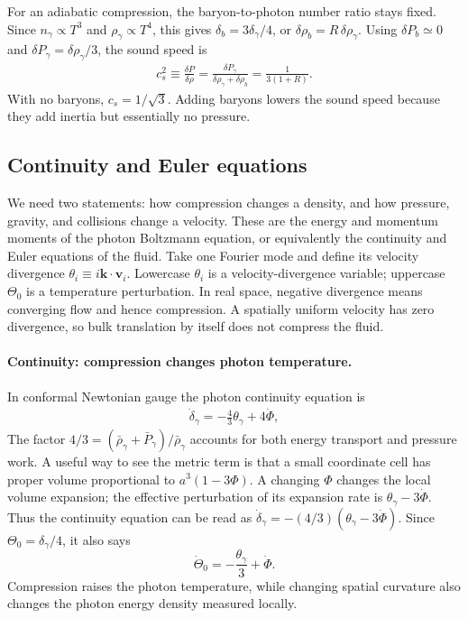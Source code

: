\documentclass[12pt]{article}
\newcommand{\be}{\begin{eqnarray}}
\newcommand{\ee}{\end{eqnarray}}
\newcommand{\bk}{\mathbf k}
\newcommand{\bv}{\mathbf v}
\begin{document}
For an adiabatic compression, the baryon-to-photon number ratio stays fixed. Since
$n_\gamma\propto T^3$ and $\rho_\gamma\propto T^4$, this gives
$\delta_b=3\delta_\gamma/4$, or $\delta\rho_b=R\,\delta\rho_\gamma$.
Using $\delta P_b\simeq0$ and $\delta P_\gamma=\delta\rho_\gamma/3$, the sound speed is
\be
c_s^2\equiv\frac{\delta P}{\delta\rho}
=\frac{\delta P_\gamma}{\delta\rho_\gamma+\delta\rho_b}
=\boxed{\frac{1}{3(1+R)}}.
\label{eq:soundspeed}
\ee
With no baryons, $c_s=1/\sqrt3$. Adding baryons lowers the sound speed because they add
inertia but essentially no pressure.

\subsection{Continuity and Euler equations}
We need two statements: how compression changes a density, and how pressure,
gravity, and collisions change a velocity. These are the energy and momentum
moments of the photon Boltzmann equation, or equivalently the continuity and Euler
equations of the fluid. Take one Fourier mode and define its velocity divergence
$\theta_i\equiv i\bk\cdot\bv_i$. Lowercase $\theta_i$ is a velocity-divergence variable;
uppercase $\Theta_0$ is a temperature perturbation. In real space, negative
divergence means converging flow and hence compression. A spatially uniform velocity
has zero divergence, so bulk translation by itself does not compress the fluid.

\paragraph{Continuity: compression changes photon temperature.}
In conformal Newtonian gauge the photon continuity equation is
\be
\dot\delta_\gamma=-\frac43\theta_\gamma+4\dot\Phi,
\label{eq:photoncontinuity}
\ee
The factor $4/3=(\bar\rho_\gamma+\bar P_\gamma)/\bar\rho_\gamma$ accounts for both
energy transport and pressure work. A useful way to see the metric term is that a
small coordinate cell has proper volume proportional to $a^3(1-3\Phi)$.
A changing $\Phi$ changes the local volume expansion; the effective perturbation
of its expansion rate is $\theta_\gamma-3\dot\Phi$. Thus the continuity equation
can be read as $\dot\delta_\gamma=-(4/3)(\theta_\gamma-3\dot\Phi)$.
Since $\Theta_0=\delta_\gamma/4$, it also says
\[
\dot\Theta_0=-\frac{\theta_\gamma}{3}+\dot\Phi.
\]
Compression raises the photon temperature, while changing spatial curvature also
changes the photon energy density measured locally.
\end{document}
